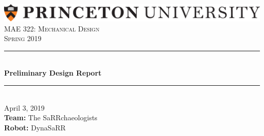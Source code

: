 

%

\begin{titlepage}

\newcommand{\HRule}{\rule{\linewidth}{0.5mm}} %

\center %
 
\includegraphics[width=\columnwidth]{./PU1linehighres.png}\\[1cm]
\textsc{\Large MAE 322: Mechanical Design}\\[0.5cm] %
\textsc{\large Spring 2019}\\[1cm] %


\HRule \\[0.6cm]
{ \huge \bfseries Preliminary Design Report}\\[0.4cm] %
\HRule \\[1cm]

{\Large April 3, 2019}\\[2cm] %

 

{\large \textbf{Team:} The SaRRchaeologists}\\[1cm]
{\large \textbf{Robot:} DynaSaRR}\\[1.6cm]


\end{titlepage}
